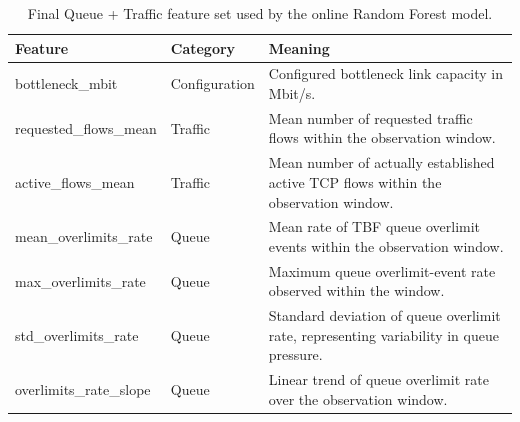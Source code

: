 \begin{table}
\caption{Final Queue + Traffic feature set used by the online Random Forest model.}
\label{tab:online_features}
\begin{tabular}{lll}
\toprule
Feature & Category & Meaning \\
\midrule
bottleneck\_mbit & Configuration & Configured bottleneck link capacity in Mbit/s. \\
requested\_flows\_mean & Traffic & Mean number of requested traffic flows within the observation window. \\
active\_flows\_mean & Traffic & Mean number of actually established active TCP flows within the observation window. \\
mean\_overlimits\_rate & Queue & Mean rate of TBF queue overlimit events within the observation window. \\
max\_overlimits\_rate & Queue & Maximum queue overlimit-event rate observed within the window. \\
std\_overlimits\_rate & Queue & Standard deviation of queue overlimit rate, representing variability in queue pressure. \\
overlimits\_rate\_slope & Queue & Linear trend of queue overlimit rate over the observation window. \\
\bottomrule
\end{tabular}
\end{table}
